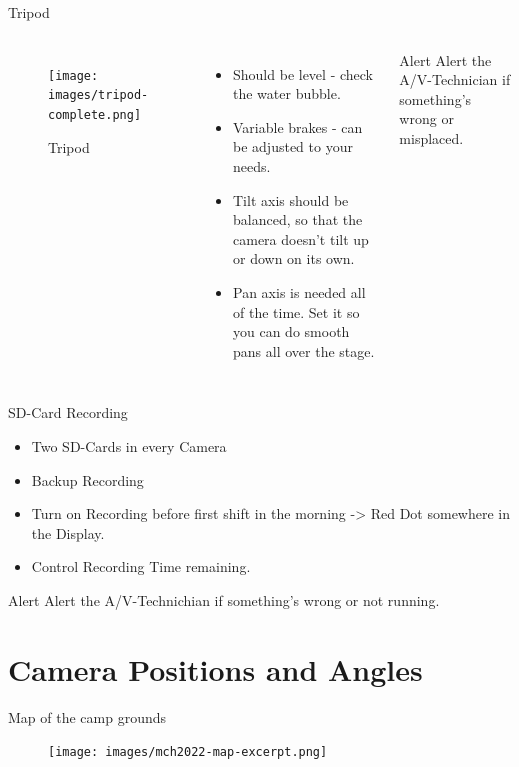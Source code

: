 \documentclass[aspectratio=169]{beamer}
\begin{document}
\begin{frame}{Tripod}
	\begin{columns}[T,onlytextwidth]
	\begin{figure} 
		\centering
		\texttt{[image: images/tripod-complete.png]}
		\caption{Tripod}
	\end{figure}
	
	\begin{itemize}
			\item Should be level - check the water bubble.
			\item Variable brakes - can be adjusted to your needs.
			\item Tilt axis should be balanced, so that the camera doesn't tilt up or down on its own.
			\item Pan axis is needed all of the time. Set it so you can do smooth pans all over the stage.
		\end{itemize}
		\begin{alertblock}{Alert}
			Alert the A/V-Technician if something's wrong or misplaced.
		\end{alertblock}
	\end{columns}
\end{frame}

\begin{frame}{SD-Card Recording}
		\begin{itemize}
			\item Two SD-Cards in every Camera
			\item Backup Recording
			\item Turn on Recording before first shift in the morning -> Red Dot somewhere in the Display.
			\item Control Recording Time remaining. 
		\end{itemize}
		\begin{alertblock}{Alert}
			Alert the A/V-Technichian if something's wrong or not running.
		\end{alertblock}
\end{frame}

\section{Camera Positions and Angles}
\begin{frame}{Map of the camp grounds}
	\begin{figure} 
		\centering
		\texttt{[image: images/mch2022-map-excerpt.png]}
	\end{figure}
\end{frame}
\end{document}
